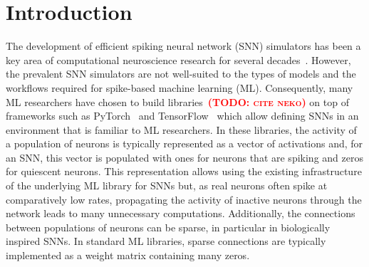 \documentclass[sigconf]{acmart}
\newcommand{\todo}[1]{\textbf{\textsc{\textcolor{red}{(TODO: #1)}}}}
\begin{document}


\maketitle

\section{Introduction}
The development of efficient spiking neural network (SNN) simulators has been a key area of computational neuroscience research for several decades~\citep{carnevale2006neuron, Gewaltig2007, Golosio2021, Akar2019,Yavuz2016}.
However, the prevalent SNN simulators are not well-suited to the types of models and the workflows required for spike-based machine learning (ML).
Consequently, many ML researchers have chosen to build libraries~\citep{norse2021, SpikingJelly,eshraghian2021training,Hazan2018}\todo{cite neko} on top of frameworks such as PyTorch~\citep{paszke2019pytorch} and TensorFlow~\citep{TensorFlow} which allow defining SNNs in an environment that is familiar to ML researchers.
In these libraries, the activity of a population of neurons is typically represented as a vector of activations and, for an SNN, this vector is populated with ones for neurons that are spiking and zeros for quiescent neurons. 
This representation allows using the existing infrastructure of the underlying ML library for SNNs but, as real neurons often spike at comparatively low rates, propagating the activity of inactive neurons through the network leads to many unnecessary computations.
Additionally, the connections between populations of neurons can be sparse, in particular in biologically inspired SNNs. In standard ML libraries, sparse connections are typically implemented as a weight matrix containing many zeros.
\end{document}
